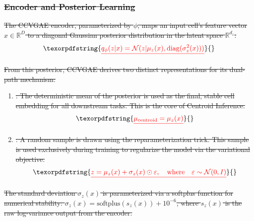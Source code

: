 \documentclass[referee, pdflatex, sn-vancouver-num]{sn-jnl}
\providecommand{\DIFdeltex}[1]{{\protect\color{red}\sout{#1}}}                      %
\providecommand{\DIFdel}[1]{\texorpdfstring{\DIFdeltex{#1}}{}} %
\begin{document}
\subsubsection{\DIFdel{Encoder and Posterior Learning}}
\addtocounter{subsubsection}{-1}%

\DIFdel{The CCVGAE encoder, parameterized by $\phi$, maps an input cell's feature vector $x \in \mathbb{R}^D$ to a diagonal Gaussian posterior distribution in the latent space $\mathbb{R}^{d_z}$:
}\begin{displaymath}
	\DIFdel{q_\phi(z|x) = \mathcal{N}(z | \mu_z(x), \operatorname{diag}(\sigma_z^2(x)))
}\end{displaymath}%

\DIFdel{From this posterior, CCVGAE derives two distinct representations for its dual-path mechanism:
}%
\begin{enumerate}%
\item%
\DIFdel{: The deterministic mean of the posterior is used as the final, stable cell embedding for all downstream tasks. This is the core of Centroid Inference.
}\begin{displaymath}
		\DIFdel{\mu_{\text{centroid}} = \mu_z(x)
	}\end{displaymath}%

\item%
\DIFdel{: A random sample is drawn using the reparameterization trick. This sample is used exclusively during training to regularize the model via the variational objective.
	}\begin{displaymath}
		\DIFdel{z = \mu_z(x) + \sigma_z(x) \odot \varepsilon, \quad \text{where} \quad \varepsilon \sim \mathcal{N}(0, I)
	}\end{displaymath}%

\end{enumerate}%
\DIFdel{The standard deviation $\sigma_z(x)$ is parameterized via a softplus function for numerical stability: $\sigma_z(x) = \text{softplus}(s_z(x)) + 10^{-6}$, where $s_z(x)$ is the raw log-variance output from the encoder.
}%
\end{document}
